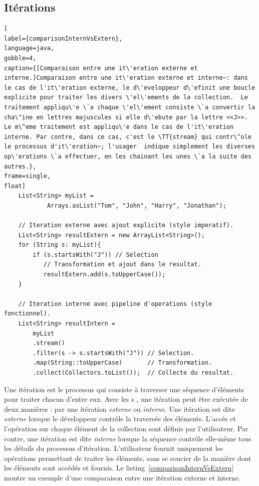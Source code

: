 \subsection{It\'erations}


\begin{lstlisting}[
label={comparisonInternVsExtern},
language=java,
gobble=4,
caption={[Comparaison entre une it\'eration externe et interne.]Comparaison entre une it\'eration externe et interne~: dans le cas de l'it\'eration externe, le d\'eveloppeur d\'efinit une boucle explicite pour traiter les divers \'el\'ements de la collection.  Le traitement appliqu\'e \`a chaque \'el\'ement consiste \`a convertir la cha\^ine en lettres majuscules si elle d\'ebute par la lettre <<J>>. Le m\^eme traitement est appliqu\'e dans le cas de l'it\'eration interne. Par contre, dans ce cas, c'est le \TT{stream} qui contr\^ole le processus d'it\'eration~; l'usager  indique simplement les diverses op\'erations \`a effectuer, en les chainant les unes \`a la suite des autres.},
frame=single,
float]
    List<String> myList =
            Arrays.asList("Tom", "John", "Harry", "Jonathan");

    // Iteration externe avec ajout explicite (style imperatif).
    List<String> resultExtern = new ArrayList<String>();
    for (String s: myList){
        if (s.startsWith("J")) // Selection
           // Transformation et ajout dans le resultat.
           resultExtern.add(s.toUpperCase()); 
    }
        
    // Iteration interne avec pipeline d'operations (style fonctionnel).
    List<String> resultIntern = 
        myList
        .stream()
        .filter(s -> s.startsWith("J")) // Selection.
        .map(String::toUpperCase)       // Transformation.
        .collect(Collectors.toList());  // Collecte du resultat.
\end{lstlisting}


Une it\'eration est le processus qui consiste \`a traverser une s\'equence d'\'el\'ements pour traiter chacun d'entre eux. Avec les s , une it\'eration peut \^etre ex\'ecut\'ee de deux mani\`eres : par une it\'eration \emph{externe} ou \emph{interne}. Une it\'eration est dite \emph{externe} lorsque le d\'eveloppeur contr\^ole la travers\'ee des \'el\'ements.  L'acc\`es et l'op\'eration sur chaque \'el\'ement de la collection sont d\'efinis par l'utilisateur. Par contre, une it\'eration est dite \emph{interne} lorsque la s\'equence contr\^ole elle-m\^eme tous les d\'etails du processus d'it\'eration. L'utilisateur fournit uniquement les op\'erations permettant de traiter les \'el\'ements, sans se soucier de la mani\`ere dont les \'el\'ements sont acc\'ed\'es et fournis. Le listing~\ref{comparisonInternVsExtern} montre un exemple d’une comparaison entre une itération externe et interne. 

